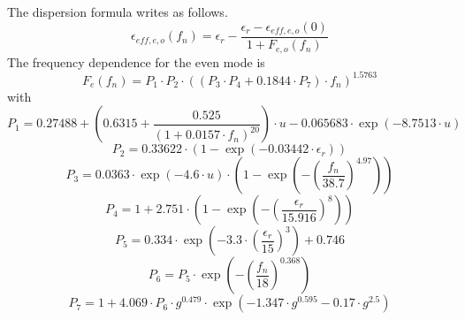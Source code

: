 \documentclass[10pt]{report}
\begin{document}
The dispersion formula writes as follows.
\begin{equation}
\epsilon_{eff,e,o}(f_n) = \epsilon_r - \frac{\epsilon_r - \epsilon_{eff,e,o}(0)}{1+F_{e,o}(f_n)}
\end{equation}
The frequency dependence for the even mode is
\begin{equation}
F_e(f_n) = P_1\cdot P_2\cdot ((P_3\cdot P_4 + 0.1844\cdot P_7)\cdot f_n)^{1.5763}
\end{equation}
with
\begin{equation}
P_1 = 0.27488 + \left( 0.6315 + \frac{0.525}{(1+0.0157\cdot f_n)^{20}} \right) \cdot u
     -0.065683\cdot\exp(-8.7513\cdot u)
\end{equation}
\begin{equation}
P_2 = 0.33622\cdot (1-\exp(-0.03442\cdot\epsilon_r))
\end{equation}
\begin{equation}
P_3 = 0.0363\cdot\exp(-4.6\cdot u)\cdot\left( 1-\exp\left(
    -\left( \frac{f_n}{38.7}\right) ^{4.97} \right) \right)
\end{equation}
\begin{equation}
P_4 = 1 + 2.751\cdot\left( 1-\exp\left( -\left( \frac{\epsilon_r}{15.916}\right) ^8 \right) \right)
\end{equation}
\begin{equation}
P_5 = 0.334\cdot\exp\left( -3.3\cdot\left( \frac{\epsilon_r}{15}\right) ^3 \right) + 0.746
\end{equation}
\begin{equation}
P_6 = P_5\cdot\exp\left( -\left( \frac{f_n}{18}\right) ^{0.368} \right)
\end{equation}
\begin{equation}
P_7 = 1 + 4.069\cdot P_6 \cdot g^{0.479}\cdot\exp(-1.347\cdot g^{0.595} - 0.17\cdot g^{2.5} )
\end{equation}
\end{document}
